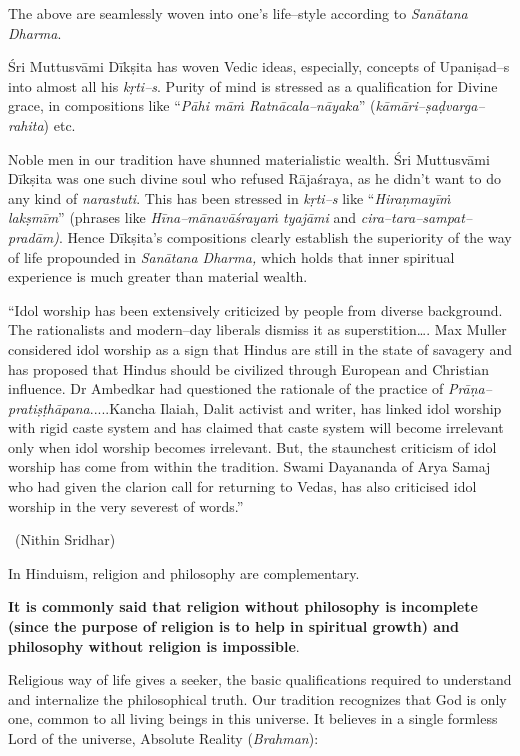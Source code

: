 The above are seamlessly woven into one’s life–style according to \textit{Sanātana Dharma}.

Śri Muttusvāmi Dīkṣita has woven Vedic ideas, especially, concepts of Upaniṣad–s into almost all his \textit{kṛti–s}. Purity of mind is stressed as a qualification for Divine grace, in compositions like “\textit{Pāhi māṁ Ratnācala–nāyaka}” (\textit{kāmāri–ṣaḍvarga–rahita}) etc.

Noble men in our tradition have shunned materialistic wealth. Śri Muttusvāmi Dīkṣita was one such divine soul who refused Rājaśraya, as he didn’t want to do any kind of \textit{narastuti}. This has been stressed in \textit{kṛti–s} like “\textit{Hiraṇmayīṁ lakṣmīm}” (phrases like \textit{Hīna–mānavāśrayaṁ tyajāmi} and \textit{cira–tara–sampat–pradām)}. Hence Dīkṣita’s compositions clearly establish the superiority of the way of life propounded in \textit{Sanātana Dharma,} which holds that inner spiritual experience is much greater than material wealth.

\begin{myquote}
“Idol worship has been extensively criticized by people from diverse background. The rationalists and modern–day liberals dismiss it as superstition…. Max Muller considered idol worship as a sign that Hindus are still in the state of savagery and has proposed that Hindus should be civilized through European and Christian influence. Dr Ambedkar had questioned the rationale of the practice of \textit{Prāṇa–pratiṣṭhāpana}.....Kancha Ilaiah, Dalit activist and writer, has linked idol worship with rigid caste system and has claimed that caste system will become irrelevant only when idol worship becomes irrelevant. But, the staunchest criticism of idol worship has come from within the tradition. Swami Dayananda of Arya Samaj who had given the clarion call for returning to Vedas, has also criticised idol worship in the very severest of words.”
\end{myquote}


~\hfill (Nithin Sridhar)

In Hinduism, religion and philosophy are complementary.

\textbf{It is commonly said that religion without philosophy is incomplete (since the purpose of religion is to help in spiritual growth) and philosophy without religion is impossible}.

Religious way of life gives a seeker, the basic qualifications required to understand and internalize the philosophical truth. Our tradition recognizes that God is only one, common to all living beings in this universe. It believes in a single formless Lord of the universe, Absolute Reality (\textit{Brahman}):

